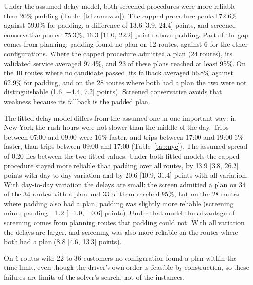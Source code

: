 \documentclass[12pt,letterpaper]{article}
\newcommand{\AmzNomPlans}{34}
\newcommand{\AmzNoPlan}{6}
\newcommand{\AmzConsNoPlan}{12}
\newcommand{\AmzNoPlanCustMin}{22}
\newcommand{\AmzNoPlanCustMax}{36}
\newcommand{\AmzCons}{59.0}
\newcommand{\AmzCap}{72.6}
\newcommand{\AmzSc}{75.3}
\newcommand{\AmzCapDiff}{13.6}
\newcommand{\AmzCapDiffLo}{3.9}
\newcommand{\AmzCapDiffHi}{24.4}
\newcommand{\AmzScDiff}{16.3}
\newcommand{\AmzScDiffLo}{11.0}
\newcommand{\AmzScDiffHi}{22.2}
\newcommand{\AmzBoth}{28}
\newcommand{\AmzBothDiff}{1.6}
\newcommand{\AmzBothDiffLo}{$-$4.4}
\newcommand{\AmzBothDiffHi}{7.2}
\newcommand{\AmzCapAdmitted}{24}
\newcommand{\AmzCapAdmittedNinetyFive}{23}
\newcommand{\AmzCapOnAdmitted}{97.4}
\newcommand{\AmzFallbackRoutes}{10}
\newcommand{\AmzCapOnFallback}{56.8}
\newcommand{\AmzConsOnFallback}{62.9}
\newcommand{\AmzDCapDiff}{13.9}
\newcommand{\AmzDCapDiffLo}{3.8}
\newcommand{\AmzDCapDiffHi}{26.2}
\newcommand{\AmzDBoth}{28}
\newcommand{\AmzDBothDiff}{$-$1.2}
\newcommand{\AmzDBothDiffLo}{$-$1.9}
\newcommand{\AmzDBothDiffHi}{$-$0.6}
\newcommand{\AmzDCapAdmitted}{34}
\newcommand{\AmzDCapAdmittedNinetyFive}{33}
\newcommand{\AmzTCapDiff}{20.6}
\newcommand{\AmzTCapDiffLo}{10.9}
\newcommand{\AmzTCapDiffHi}{31.4}
\newcommand{\AmzTBothDiff}{8.8}
\newcommand{\AmzTBothDiffLo}{4.6}
\newcommand{\AmzTBothDiffHi}{13.3}
\newcommand{\NycAmFaster}{16}
\newcommand{\NycPmFaster}{6}
\begin{document}
Under the assumed delay model, both screened procedures were more reliable than
20\% padding (Table~\ref{tab:amazon}). The capped procedure pooled \AmzCap\%
against \AmzCons\% for padding, a difference of \AmzCapDiff{} [\AmzCapDiffLo,
\AmzCapDiffHi] points, and screened conservative pooled \AmzSc\%, \AmzScDiff{}
[\AmzScDiffLo, \AmzScDiffHi] points above padding. Part of the gap comes from
planning: padding found no plan on \AmzConsNoPlan{} routes, against \AmzNoPlan{} for
the other configurations. Where the capped procedure admitted a plan
(\AmzCapAdmitted{} routes), its validated service averaged \AmzCapOnAdmitted\%, and
\AmzCapAdmittedNinetyFive{} of these plans reached at least 95\%. On the
\AmzFallbackRoutes{} routes where no candidate passed, its fallback averaged
\AmzCapOnFallback\% against \AmzConsOnFallback\% for padding, and on the
\AmzBoth{} routes where both had a plan the two were not distinguishable
(\AmzBothDiff{} [\AmzBothDiffLo, \AmzBothDiffHi] points). Screened conservative
avoids that weakness because its fallback is the padded plan.

The fitted delay model differs from the assumed one in one important way: in New
York the rush hours were not slower than the middle of the day. Trips between
07:00 and 09:00 were \NycAmFaster\% faster, and trips between 17:00 and 19:00
\NycPmFaster\% faster, than trips between 09:00 and 17:00 (Table~\ref{tab:nyc}). The
assumed spread of 0.20 lies between the two fitted values. Under both fitted models
the capped procedure stayed more reliable than padding over all routes, by
\AmzDCapDiff{} [\AmzDCapDiffLo, \AmzDCapDiffHi] points with day-to-day variation
and by \AmzTCapDiff{} [\AmzTCapDiffLo, \AmzTCapDiffHi] points with all variation.
With day-to-day variation the delays are small: the screen admitted a plan on
\AmzDCapAdmitted{} of the \AmzNomPlans{} routes with a plan and
\AmzDCapAdmittedNinetyFive{} of them reached 95\%, but on the \AmzDBoth{} routes
where padding also had a plan, padding was slightly more reliable (screening minus
padding \AmzDBothDiff{} [\AmzDBothDiffLo, \AmzDBothDiffHi] points). Under that
model the advantage of screening comes from planning routes that padding could
not. With all variation the delays are larger, and screening was also more
reliable on the routes where both had a plan (\AmzTBothDiff{} [\AmzTBothDiffLo,
\AmzTBothDiffHi] points).

On \AmzNoPlan{} routes with \AmzNoPlanCustMin{} to \AmzNoPlanCustMax{} customers no
configuration found a plan within the time limit, even though the driver's own
order is feasible by construction, so these failures are limits of the solver's
search, not of the instances.
\end{document}
